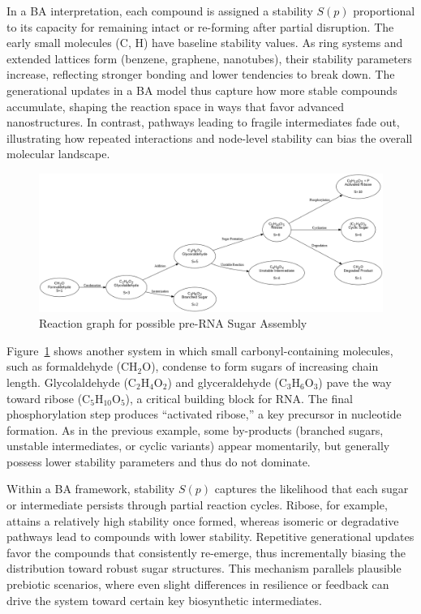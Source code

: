 \documentclass[entropy,article,submit,pdftex,moreauthors]{Definitions/mdpi}
\begin{document}
In a BA interpretation, each compound is assigned a stability $S(p)$ proportional to its capacity for remaining intact or re-forming after partial disruption. The early small molecules (C, H) have baseline stability values. As ring systems and extended lattices form (benzene, graphene, nanotubes), their stability parameters increase, reflecting stronger bonding and lower tendencies to break down. The generational updates in a BA model thus capture how more stable compounds accumulate, shaping the reaction space in ways that favor advanced nanostructures. In contrast, pathways leading to fragile intermediates fade out, illustrating how repeated interactions and node-level stability can bias the overall molecular landscape.

\begin{figure}[h]
    \centering
    \includegraphics[width=1\textwidth]{abc_prerna.png}
    \caption{Reaction graph for possible pre-RNA Sugar Assembly}
    \label{fig:abc_prerna}
\end{figure}

Figure~\ref{fig:abc_prerna} shows another system in which small carbonyl-containing molecules, such as formaldehyde (CH$_2$O), condense to form sugars of increasing chain length. Glycolaldehyde (C$_2$H$_4$O$_2$) and glyceraldehyde (C$_3$H$_6$O$_3$) pave the way toward ribose (C$_5$H$_{10}$O$_5$), a critical building block for RNA. The final phosphorylation step produces ``activated ribose,'' a key precursor in nucleotide formation. As in the previous example, some by-products (branched sugars, unstable intermediates, or cyclic variants) appear momentarily, but generally possess lower stability parameters and thus do not dominate.

Within a BA framework, stability $S(p)$ captures the likelihood that each sugar or intermediate persists through partial reaction cycles. Ribose, for example, attains a relatively high stability once formed, whereas isomeric or degradative pathways lead to compounds with lower stability. Repetitive generational updates favor the compounds that consistently re-emerge, thus incrementally biasing the distribution toward robust sugar structures. This mechanism parallels plausible prebiotic scenarios, where even slight differences in resilience or feedback can drive the system toward certain key biosynthetic intermediates.
\end{document}
